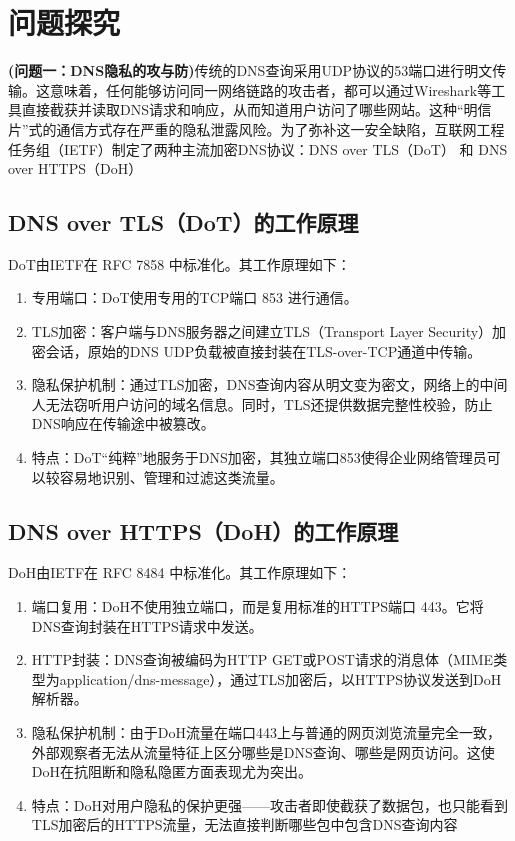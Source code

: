 \documentclass[12pt]{ctexart}
\begin{document}
	\section{问题探究}
		\textbf{(问题一：DNS隐私的攻与防)}传统的DNS查询采用UDP协议的53端口进行明文传输。这意味着，任何能够访问同一网络链路的攻击者，都可以通过Wireshark等工具直接截获并读取DNS请求和响应，从而知道用户访问了哪些网站。这种“明信片”式的通信方式存在严重的隐私泄露风险。为了弥补这一安全缺陷，互联网工程任务组（IETF）制定了两种主流加密DNS协议：DNS over TLS（DoT） 和 DNS over HTTPS（DoH）
		\subsection*{DNS over TLS（DoT）的工作原理}
		DoT由IETF在 RFC 7858 中标准化。其工作原理如下：
		\begin{enumerate}			
			\item 专用端口：DoT使用专用的TCP端口 853 进行通信。
			
			\item TLS加密：客户端与DNS服务器之间建立TLS（Transport Layer Security）加密会话，原始的DNS UDP负载被直接封装在TLS-over-TCP通道中传输。
			
			\item 隐私保护机制：通过TLS加密，DNS查询内容从明文变为密文，网络上的中间人无法窃听用户访问的域名信息。同时，TLS还提供数据完整性校验，防止DNS响应在传输途中被篡改。
			
			\item 特点：DoT“纯粹”地服务于DNS加密，其独立端口853使得企业网络管理员可以较容易地识别、管理和过滤这类流量。
		\end{enumerate}
		\subsection*{DNS over HTTPS（DoH）的工作原理}
		DoH由IETF在 RFC 8484 中标准化。其工作原理如下：
		\begin{enumerate}
			\item 端口复用：DoH不使用独立端口，而是复用标准的HTTPS端口 443。它将DNS查询封装在HTTPS请求中发送。
			
			\item HTTP封装：DNS查询被编码为HTTP GET或POST请求的消息体（MIME类型为application/dns-message），通过TLS加密后，以HTTPS协议发送到DoH解析器。
			
			\item 隐私保护机制：由于DoH流量在端口443上与普通的网页浏览流量完全一致，外部观察者无法从流量特征上区分哪些是DNS查询、哪些是网页访问。这使DoH在抗阻断和隐私隐匿方面表现尤为突出。
			
			\item 特点：DoH对用户隐私的保护更强——攻击者即使截获了数据包，也只能看到TLS加密后的HTTPS流量，无法直接判断哪些包中包含DNS查询内容
		\end{enumerate}
\end{document}
